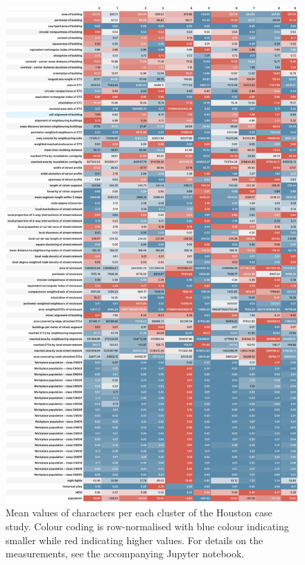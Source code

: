 \begin{figure}
  \includegraphics[width=\linewidth]{figures/houston_means.png}
  \caption{Mean values of characters per each cluster of the Houston case study.
  Colour coding is row-normalised with blue colour indicating smaller while red indicating
  higher values. For details on the measurements, see the accompanying Jupyter notebook.
  }
  \label{fig:means_hou}
\end{figure}

